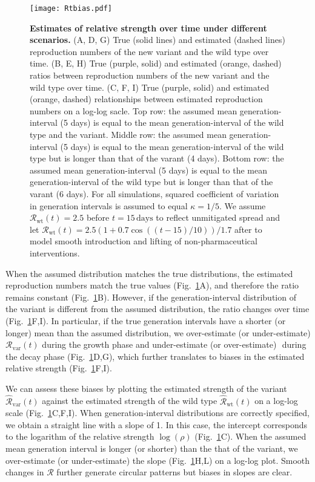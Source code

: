 \documentclass[12pt]{article}
\newcommand{\fref}[1]{Fig.~\ref{fig:#1}}
\newcommand{\Rx}[1]{\ensuremath{{\mathcal R}_{#1}}\xspace}
\newcommand{\Ry}[1]{\Rx{\mathrm{#1}}}
\newcommand{\RR}{\ensuremath{{\mathcal R}}\xspace}
\begin{document}
\begin{figure}[!th]
\texttt{[image: Rtbias.pdf]}
\caption{
\textbf{Estimates of relative strength over time under different scenarios.}
(A, D, G) True (solid lines) and estimated (dashed lines) reproduction numbers of the new variant and the wild type over time.
(B, E, H) True (purple, solid) and estimated (orange, dashed) ratios between reproduction numbers of the new variant and the wild type over time.
(C, F, I) True (purple, solid) and estimated (orange, dashed) relationships between estimated reproduction numbers on a log-log sacle.
Top row: the assumed mean generation-interval (5 days) is equal to the mean generation-interval of the wild type and the variant.
Middle row: the assumed mean generation-interval (5 days) is equal to the mean generation-interval of the wild type but is longer than that of the varant (4 days).
Bottom row: the assumed mean generation-interval (5 days) is equal to the mean generation-interval of the wild type but is longer than that of the varant (6 days).
For all simulations, squared coefficient of variation in generation intervals is assumed to equal $\kappa = 1/5$.
We assume $\Ry{wt}(t)=2.5$ before $t=15\,\textrm{days}$ to reflect unmitigated spread and let $\Ry{wt}(t)=2.5 (1+0.7\cos((t-15)/10))/1.7$ after to model smooth introduction and lifting of non-pharmaceutical interventions.
}
\label{fig:Rtbias}
\end{figure}

When the assumed distribution matches the true distributions, the estimated reproduction numbers match the true values (\fref{Rtbias}A), and therefore the ratio remains constant (\fref{Rtbias}B).
However, if the generation-interval distribution of the variant is different from the assumed distribution, the ratio changes over time (\fref{Rtbias}F,I).
In particular, if the true generation intervals have a shorter (or longer) mean than the assumed distribution, we over-estimate (or under-estimate) $\Ry{var}(t)$ during the growth phase and under-estimate (or over-estimate) $ $ during the decay phase (\fref{Rtbias}D,G), which further translates to biases in the estimated relative strength (\fref{Rtbias}F,I).

We can assess these biases by plotting the estimated strength of the variant $\hat{\RR}_{\textrm{var}}(t)$ against the estimated strength of the wild type $\hat{\RR}_{\textrm{wt}}(t)$ on a log-log scale (\fref{Rtbias}C,F,I).
When generation-interval distributions are correctly specified, we obtain a straight line with a slope of 1. 
In this case, the intercept corresponds to the logarithm of the relative strength $\log(\rho)$ (\fref{Rtbias}C).
When the assumed mean generation interval is longer (or shorter) than the that of the variant, we over-estimate (or under-estimate) the slope (\fref{Rtbias}H,L) on a log-log plot.
Smooth changes in $\RR$ further generate circular patterns but biases in slopes are clear.
\end{document}
